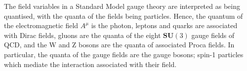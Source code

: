 The field variables in a Standard Model gauge theory are interpreted as being quantised, with the quanta of the fields being particles. Hence, the quantum of the electromagnetic field $A^{\mu}$ is the photon, leptons and quarks are associated with Dirac fields, gluons are the quanta of the eight $\mathbf{SU}(3)$ gauge fields of QCD, and the W and Z bosons are the quanta of associated Proca fields. In particular, the quanta of the gauge fields are the gauge bosons; spin-1 particles which mediate the interaction associated with their field.